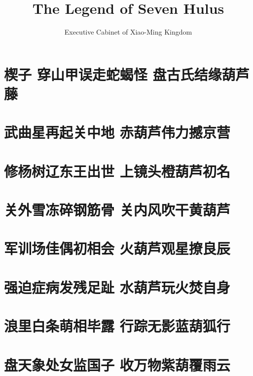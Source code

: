 \documentclass[12pt, a4paper]{book}
\title{\textbf{The Legend of Seven Hulus}}
\author{Executive Cabinet of Xiao-Ming Kingdom}
\date{}
\begin{document}
\begin{CJK}{UTF8}{gbsn}

    \maketitle
    \clearpage
    \thispagestyle{empty}

    \frontmatter

    
    

    \chapter{楔子  穿山甲误走蛇蝎怪 盘古氏结缘葫芦藤}

    \tableofcontents

    \mainmatter


    \chapter{武曲星再起关中地 赤葫芦伟力撼京营}

    \chapter{修杨树辽东王出世 上镜头橙葫芦初名}

    \chapter{关外雪冻碎钢筋骨 关内风吹干黄葫芦}

    \chapter{军训场佳偶初相会 火葫芦观星撩良辰}

    \chapter{强迫症病发残足趾 水葫芦玩火焚自身}

    \chapter{浪里白条萌相毕露 行踪无影蓝葫狐行}

    \chapter{盘天象处女监国子 收万物紫葫覆雨云}


\end{CJK}
\end{document}
